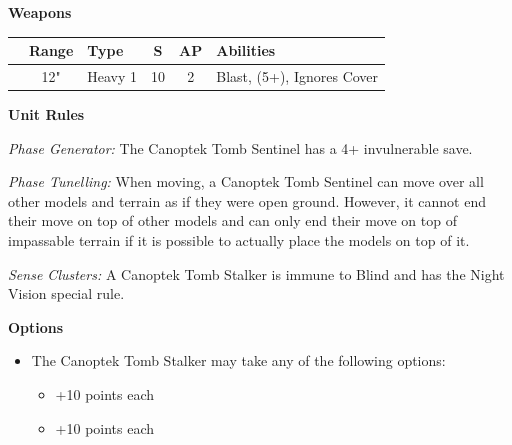 \begin{minipage}[t]{0.72\textwidth}
	\vspace*{2em}
	\textbf{Weapons}
	
	\begin{tabular}{L{90 pt} c C{40pt} *{2}{c} >{\raggedright\arraybackslash}p{130pt}}
		& Range & Type & S & AP & Abilities \\
		\hline
		 & 12" & Heavy 1 & 10 & 2 & Blast,  (5+), Ignores Cover \\
	\end{tabular}
	
	\vspace*{2em}
	\textbf{Unit Rules}
	
	\textit{Phase Generator:} The Canoptek Tomb Sentinel has a 4+ invulnerable save.
	
	\textit{Phase Tunelling:} When moving, a Canoptek Tomb Sentinel can move over all other models and terrain as if they were open ground. However, it cannot end their move on top of other models and can only end their move on top of impassable terrain if it is possible to actually place the models on top of it.
	
	\textit{Sense Clusters:} A Canoptek Tomb Stalker is immune to Blind and has the Night Vision special rule.	
	
	\vspace*{2em}
	\textbf{Options}
	\begin{itemize}
		\item The Canoptek Tomb Stalker may take any of the following options:
		\begin{itemize}
			\item {} \dotfill +10 points each
			\item {} \dotfill +10 points each
		\end{itemize}
	\end{itemize}
\end{minipage}
\hspace{0.5em}


\newpage
\subsubsection[Canoptek Tomb Stalker]{}

